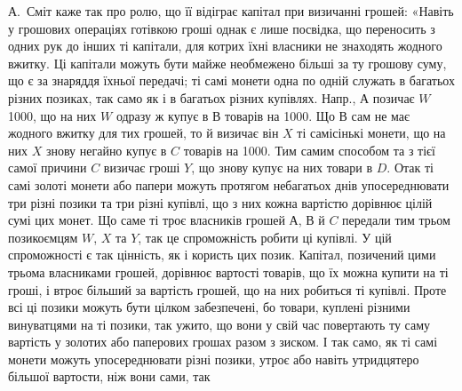 А.~Сміт каже так про ролю, що її відіграє капітал при визичанні грошей:
«Навіть у грошових операціях готівкою гроші однак є лише посвідка, що переносить
з одних рук до інших ті капітали, для котрих їхні власники не знаходять
жодного вжитку. Ці капітали можуть бути майже необмежено більші за ту
грошову суму, що є за знаряддя їхньої передачі; ті самі монети одна по одній
служать в багатьох різних позиках, так само як і в багатьох різних купівлях.
Напр., $А$ позичає $W$ 1000, що на них $W$ одразу ж купує в $В$ товарів
на 1000. Що $В$ сам не має жодного вжитку для тих грошей, то й визичає
він $X$ ті самісінькі монети, що на них $X$ знову негайно купує в $C$ товарів
на 1000. Тим самим способом та з тієї самої причини $C$ визичає гроші
$Y$, що знову купує на них товари в $D$. Отак ті самі золоті монети або папери
можуть протягом небагатьох днів упосереднювати три різні позики та три різні
купівлі, що з них кожна вартістю дорівнює цілій сумі цих монет. Що саме ті троє
власників грошей $А$, $В$ й $C$ передали тим трьом позикоємцям $W$, $X$ та $Y$, так це
спроможність робити ці купівлі. У цій спроможності є так цінність, як і користь цих
позик. Капітал, позичений цими трьома власниками грошей, дорівнює вартості
товарів, що їх можна купити на ті гроші, і втроє більший за вартість грошей,
що на них робиться ті купівлі. Проте всі ці позики можуть бути цілком забезпечені,
бо товари, куплені різними винуватцями на ті позики, так ужито, що
вони у свій час повертають ту саму вартість у золотих або паперових грошах
разом з зиском. І так само, як ті самі монети можуть упосереднювати різні позики,
утроє або навіть утридцятеро більшої вартости, ніж вони сами, так
\parbreak{}  %
